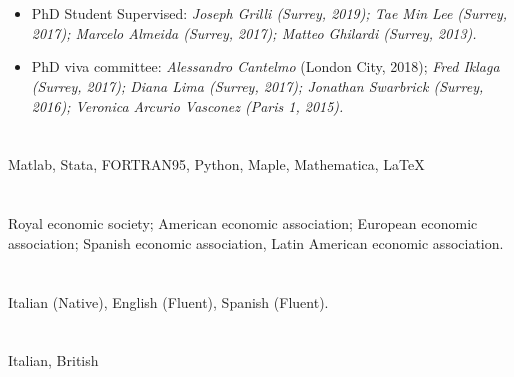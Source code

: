 \documentclass[margin, 11pt]{res} %
\begin{document}
\begin{resume}
\section{}
\begin{itemize}
\item PhD Student Supervised: \emph{Joseph Grilli (Surrey, 2019); Tae Min Lee (Surrey, 2017); Marcelo Almeida (Surrey, 2017); Matteo Ghilardi (Surrey, 2013).}
\item PhD viva committee: \emph{Alessandro Cantelmo} (London City, 2018); \emph{Fred Iklaga (Surrey, 2017); Diana Lima (Surrey, 2017); Jonathan Swarbrick (Surrey, 2016); Veronica Arcurio Vasconez (Paris 1, 2015).}
\end{itemize}


\section{}
Matlab, Stata, FORTRAN95, Python, Maple, Mathematica, \LaTeX\\

 
\section{}
Royal economic society; American economic association; European economic association; Spanish economic association, Latin American economic association.

\section{}
Italian (Native), English (Fluent), Spanish (Fluent).

\section{}
Italian, British \\





\end{resume}
\end{document}
